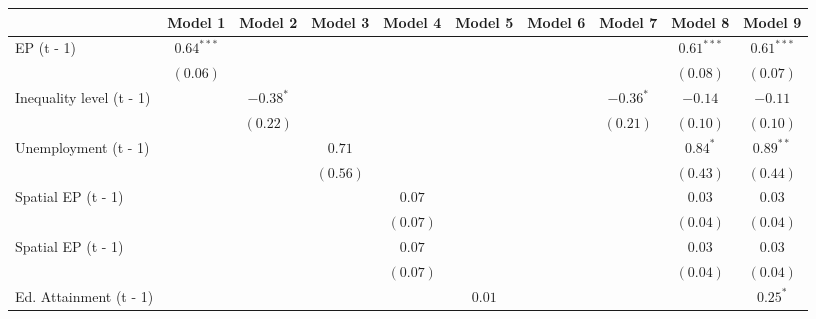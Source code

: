 
\begin{table}
\begin{center}
\begin{tabular}{l c c c c c c c c c}
\hline
 & Model 1 & Model 2 & Model 3 & Model 4 & Model 5 & Model 6 & Model 7 & Model 8 & Model 9 \\
\hline
EP (t - 1)                        & $0.64^{***}$ &              &              &              &              &              &              & $0.61^{***}$ & $0.61^{***}$ \\
                                  & $(0.06)$     &              &              &              &              &              &              & $(0.08)$     & $(0.07)$     \\
Inequality level (t - 1)          &              & $-0.38^{*}$  &              &              &              &              & $-0.36^{*}$  & $-0.14$      & $-0.11$      \\
                                  &              & $(0.22)$     &              &              &              &              & $(0.21)$     & $(0.10)$     & $(0.10)$     \\
Unemployment (t - 1)              &              &              & $0.71$       &              &              &              &              & $0.84^{*}$   & $0.89^{**}$  \\
                                  &              &              & $(0.56)$     &              &              &              &              & $(0.43)$     & $(0.44)$     \\
Spatial EP (t - 1)                &              &              &              & $0.07$       &              &              &              & $0.03$       & $0.03$       \\
                                  &              &              &              & $(0.07)$     &              &              &              & $(0.04)$     & $(0.04)$     \\
Spatial EP (t - 1)                &              &              &              & $0.07$       &              &              &              & $0.03$       & $0.03$       \\
                                  &              &              &              & $(0.07)$     &              &              &              & $(0.04)$     & $(0.04)$     \\
Ed. Attainment (t - 1)            &              &              &              &              & $0.01$       &              &              &              & $0.25^{*}$   \\

\end{tabular}
\end{center}
\end{table}
